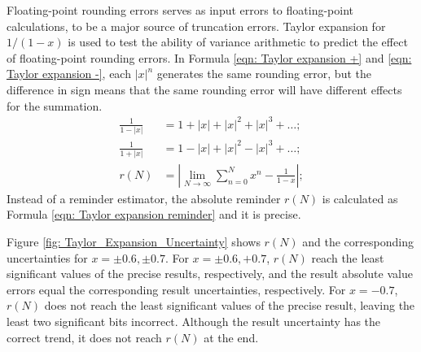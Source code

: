 \documentclass[twoside]{article}
\numberwithin{equation}{section}
\begin{document}
Floating-point rounding errors serves as input errors to floating-point calculations, to be a major source of truncation errors.
Taylor expansion for $1/(1-x)$ is used to test the ability of variance arithmetic to predict the effect of floating-point rounding errors.
In Formula \eqref{eqn: Taylor expansion +} and \eqref{eqn: Taylor expansion -}, each $|x|^n$ generates the same rounding error, but the difference in sign means that the same rounding error will have different effects for the summation. 
\begin{align}
\label{eqn: Taylor expansion +}
\frac{1}{1 - |x|} &= 1 + |x| + |x|^2 + |x|^3 + \dots; \\
\label{eqn: Taylor expansion -}
\frac{1}{1 + |x|} &= 1 - |x| + |x|^2 - |x|^3 + \dots; \\
\label{eqn: Taylor expansion reminder}
r(N) & = \left| \lim_{N \rightarrow \infty} \sum_{n = 0}^{N} x^n - \frac{1}{1-x} \right|;
\end{align}
Instead of a reminder estimator, the absolute reminder $r(N)$ is calculated as Formula \eqref{eqn: Taylor expansion reminder} and it is precise.

Figure \ref{fig: Taylor_Expansion_Uncertainty} shows $r(N)$ and the corresponding uncertainties for $x = \pm 0.6, \pm 0.7$.
For $x = \pm 0.6, +0.7$, $r(N)$ reach the least significant values of the precise results, respectively, and the result absolute value errors equal the corresponding result uncertainties, respectively. 
For $x = -0.7$, $r(N)$ does not reach the least significant values of the precise result, leaving the least two significant bits incorrect.
Although the result uncertainty has the correct trend, it does not reach $r(N)$ at the end.
\end{document}
